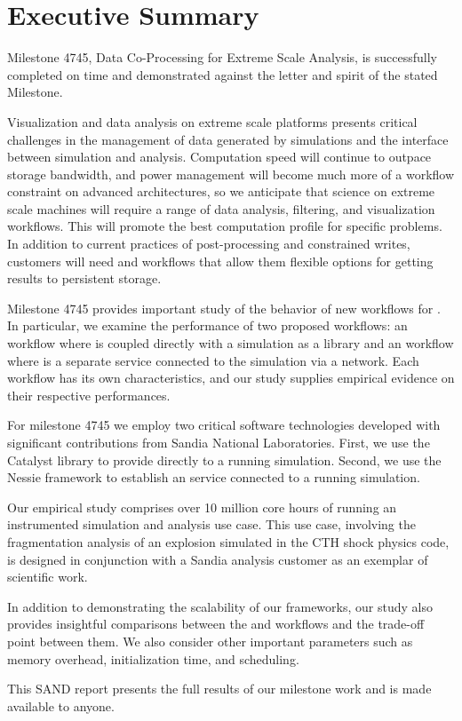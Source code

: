 \section*{Executive Summary}

Milestone 4745, Data Co-Processing for Extreme Scale Analysis, is
successfully completed on time and demonstrated against the letter and
spirit of the stated Milestone.

Visualization and data analysis on extreme scale platforms presents
critical challenges in the management of data generated by simulations and
the interface between simulation and analysis.  Computation speed will continue
to outpace storage bandwidth, and power management will become much more of
a workflow constraint on advanced architectures, so we anticipate that 
science on extreme scale 
machines will require a range of data analysis, filtering, and visualization
workflows.  This will promote the best computation profile for specific 
problems.  In addition to current practices of post-processing and 
constrained writes, customers will need \insitu and \intransit workflows that
allow them flexible options for getting results to persistent storage.

Milestone 4745 provides important study of the behavior of new workflows
for \vda.  In particular, we examine the performance of two proposed
workflows: an \insitu workflow where \vda is coupled directly with a
simulation as a library and an \intransit workflow where \vda is a separate
service connected to the simulation via a network.  Each workflow has its
own characteristics, and our study supplies empirical evidence on their
respective performances.

For milestone 4745 we employ two critical software technologies developed
with significant contributions from Sandia National Laboratories.  First,
we use the Catalyst library to provide \insitu \vda directly to a running
simulation.  Second, we use the Nessie framework to establish an \intransit
\vda service connected to a running simulation.

Our empirical study comprises over 10 million core hours of running an
instrumented simulation and analysis use case.  This use case, involving
the fragmentation analysis of an explosion simulated in the CTH shock
physics code, is designed in conjunction with a Sandia analysis customer as
an exemplar of scientific work.

In addition to demonstrating the scalability of our frameworks, our study
also provides insightful comparisons between the \insitu and \intransit
workflows and the trade-off point between them.  We also consider other
important parameters such as memory overhead, initialization time, and
scheduling.

This SAND report presents the full results of our milestone work and is
made available to anyone.
